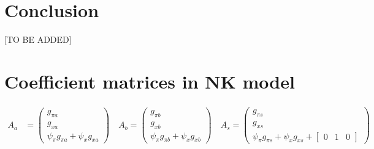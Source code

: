 \documentclass[11pt]{article}
\renewcommand{\[}{\begin{equation}}
\renewcommand{\]}{\end{equation}}
\begin{document}
\section{Conclusion}\label{conclusion}
[TO BE ADDED]

\newpage


\nocite{*}

\newpage
\appendix
\section{Coefficient matrices in NK model}\label{app_A_matrices}
\begin{align}
A_a & = \begin{pmatrix} g_{\pi a} \\ g_{x a} \\ \psi_{\pi}g_{\pi a} + \psi_xg_{x a}
\end{pmatrix}
\quad A_b = \begin{pmatrix} g_{\pi b} \\ g_{x b} \\ \psi_{\pi}g_{\pi b} + \psi_xg_{x b}
\end{pmatrix}
 \quad A_s = \begin{pmatrix} g_{\pi s} \\ g_{x s} \\ \psi_{\pi}g_{\pi s} + \psi_xg_{x s} + \begin{bmatrix} 0 & 1& 0\end{bmatrix}

\end{pmatrix}
\end{align}
\end{document}
